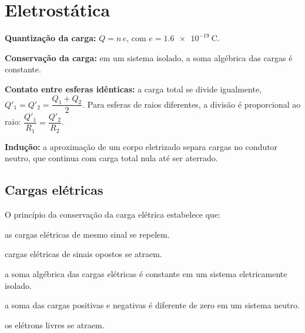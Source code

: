 \section{Eletrostática}

\begin{conceito}
\textbf{Quantização da carga:} $Q = n\,e$, com $e = \SI{1.6e-19}{\coulomb}$.\par
\textbf{Conservação da carga:} em um sistema isolado, a soma algébrica das cargas é constante.\par
\textbf{Contato entre esferas idênticas:} a carga total se divide igualmente,
$Q'_1 = Q'_2 = \dfrac{Q_1+Q_2}{2}$. Para esferas de raios diferentes, a divisão é
proporcional ao raio: $\dfrac{Q'_1}{R_1} = \dfrac{Q'_2}{R_2}$.\par
\textbf{Indução:} a aproximação de um corpo eletrizado separa cargas no condutor
neutro, que continua com carga total nula até ser aterrado.
\end{conceito}

\legendaniveis

\subsection{Cargas elétricas}


\blocofixacao

\begin{questao}[1]{}
O princípio da conservação da carga elétrica estabelece que:
\begin{alternativas}
\item as cargas elétricas de mesmo sinal se repelem.
\item cargas elétricas de sinais opostos se atraem.
\item a soma algébrica das cargas elétricas é constante em um sistema eletricamente isolado.
\item a soma das cargas positivas e negativas é diferente de zero em um sistema neutro.
\item os elétrons livres se atraem.
\end{alternativas}
\end{questao}

